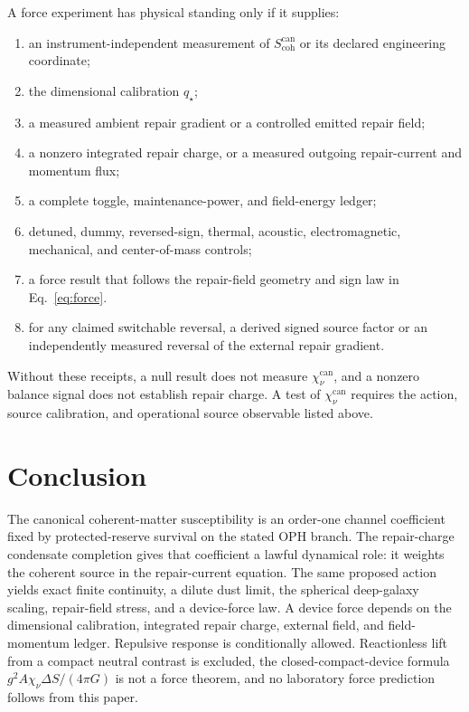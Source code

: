 \documentclass[11pt]{article}
\numberwithin{equation}{section}
\theoremstyle{remark}
\newcommand{\chinu}{\chi_\nu}
\newcommand{\chican}{\chi_\nu^{\mathrm{can}}}
\newcommand{\scohcan}{S_{\mathrm{coh}}^{\mathrm{can}}}
\begin{document}
A force experiment has physical standing only if it supplies:
\begin{enumerate}
\item an instrument-independent measurement of \(\scohcan\) or its declared
engineering coordinate;
\item the dimensional calibration \(q_\star\);
\item a measured ambient repair gradient or a controlled emitted repair field;
\item a nonzero integrated repair charge, or a measured outgoing repair-current
and momentum flux;
\item a complete toggle, maintenance-power, and field-energy ledger;
\item detuned, dummy, reversed-sign, thermal, acoustic, electromagnetic,
mechanical, and center-of-mass controls;
\item a force result that follows the repair-field geometry and sign law in
Eq.~\eqref{eq:force}.
\item for any claimed switchable reversal, a derived signed source factor or
an independently measured reversal of the external repair gradient.
\end{enumerate}

Without these receipts, a null result does not measure \(\chican\), and a
nonzero balance signal does not establish repair charge. A test of
\(\chican\) requires the action, source calibration, and operational source
observable listed above.

\section{Conclusion}

The canonical coherent-matter susceptibility is an order-one channel
coefficient fixed by protected-reserve survival on the stated OPH branch. The
repair-charge condensate completion gives that coefficient a lawful dynamical
role: it weights the coherent source in the repair-current equation. The same
proposed action yields exact finite continuity, a dilute dust limit, the
spherical deep-galaxy scaling, repair-field stress, and a device-force law.
A device force depends on the dimensional calibration, integrated repair
charge, external field, and field-momentum ledger. Repulsive response is
conditionally allowed. Reactionless lift from a compact neutral contrast is
excluded, the closed-compact-device formula
\(g^2A\chinu\Delta S/(4\pi G)\) is not a force theorem, and no laboratory
force prediction follows from this paper.
\end{document}
